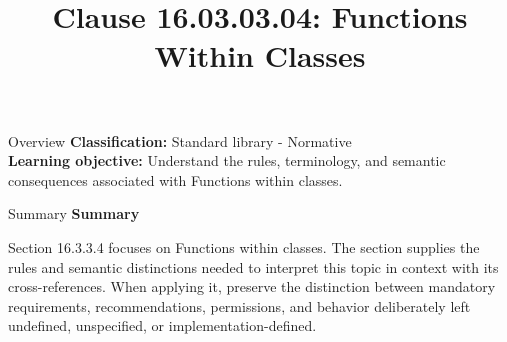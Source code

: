\documentclass[10pt,letterpaper]{article}
\title{Clause 16.03.03.04: Functions Within Classes}
\author{}
\date{}
\begin{document}
\maketitle
\begin{CornellOverviewBox}{Overview}
\textbf{Classification:} Standard library - Normative\\[2pt]
\textbf{Learning objective:} Understand the rules, terminology, and semantic consequences associated with Functions within classes.
\end{CornellOverviewBox}\begin{CornellSummaryBox}{Summary}
{\sffamily\bfseries\color{Accent} Summary}\par\vspace{3pt}Section 16.3.3.4 focuses on Functions within classes. The section supplies the rules and semantic distinctions needed to interpret this topic in context with its cross-references. When applying it, preserve the distinction between mandatory requirements, recommendations, permissions, and behavior deliberately left undefined, unspecified, or implementation-defined.
\end{CornellSummaryBox}
\end{document}
